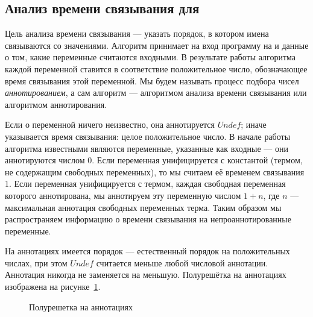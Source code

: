 \subsection{Анализ времени связывания для \miniKanren{}}

Цель анализа времени связывания --- указать порядок, в котором имена связываются со значениями.
Алгоритм принимает на вход программу на \miniKanren{} и данные о том, какие переменные считаются входными. 
В результате работы алгоритма каждой переменной ставится в соответствие положительное число, обозначающее время связывания этой переменной.
Мы будем называть процесс подбора чисел \emph{аннотированием}, а сам алгоритм --- алгоритмом анализа времени связывания или алгоритмом аннотирования.

Если о переменной ничего неизвестно, она аннотируется $Undef$; иначе указывается время связывания: целое положительное число.
В начале работы алгоритма известными являются переменные, указанные как входные --- они аннотируются числом $0$.
Если переменная унифицируется с константой (термом, не содержащим свободных переменных), то мы считаем её временем связывания $1$.
Если переменная унифицируется с термом, каждая свободная переменная которого аннотирована, мы аннотируем эту переменную числом $1+n$, где $n$ --- максимальная аннотация свободных переменных терма. 
Таким образом мы распространяем информацию о времени связывания на непроаннотированные переменные.

На аннотациях имеется порядок --- естественный порядок на положительных числах, при этом $Undef$ считается меньше любой числовой аннотации.
Аннотация никогда не заменяется на меньшую.
Полурешётка на аннотациях изображена на рисунке~\ref{fig:semilattice}.

\begin{figure}[htbp]
  \centering
  \caption{Полурешетка на аннотациях}
  \label{fig:semilattice}
\end{figure}
